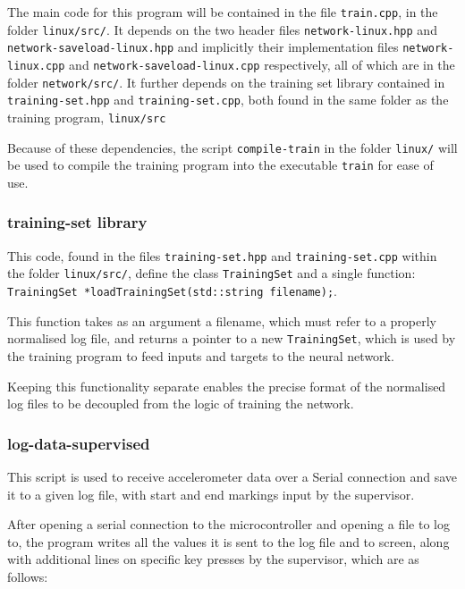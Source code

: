 \documentclass[a4paper]{article}
\begin{document}
The main code for this program will be contained in the file \lstinline{train.cpp}, in the folder \lstinline{linux/src/}. It depends on the two header files \lstinline{network-linux.hpp} and \lstinline{network-saveload-linux.hpp} and implicitly their implementation files \lstinline{network-linux.cpp} and \lstinline{network-saveload-linux.cpp} respectively, all of which are in the folder \lstinline{network/src/}. It further depends on the training set library contained in \lstinline{training-set.hpp} and \lstinline{training-set.cpp}, both found in the same folder as the training program, \lstinline{linux/src}

Because of these dependencies, the script \lstinline{compile-train} in the folder \lstinline{linux/} will be used to compile the training program into the executable \lstinline{train} for ease of use.

\subsubsection{training-set library}
\label{subsubsec:dc_csa_trainingset}

This code, found in the files \lstinline{training-set.hpp} and \lstinline{training-set.cpp} within the folder \lstinline{linux/src/}, define the class \lstinline{TrainingSet} and a single function: \lstinline{TrainingSet *loadTrainingSet(std::string filename);}.

This function takes as an argument a filename, which must refer to a properly normalised log file, and returns a pointer to a new \lstinline{TrainingSet}, which is used by the training program to feed inputs and targets to the neural network.

Keeping this functionality separate enables the precise format of the normalised log files to be decoupled from the logic of training the network.

\subsubsection{log-data-supervised}
\label{subsubsec:dc_csa_logsupervised}

This script is used to receive accelerometer data over a Serial connection and save it to a given log file, with start and end markings input by the supervisor.

After opening a serial connection to the microcontroller and opening a file to log to, the program writes all the values it is sent to the log file and to screen, along with additional lines on specific key presses by the supervisor, which are as follows:
\end{document}
